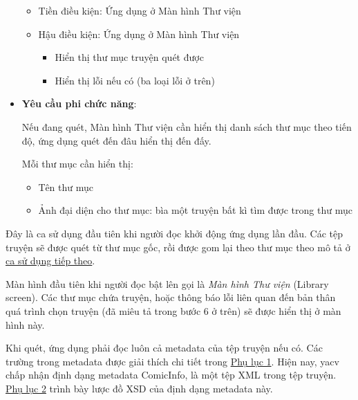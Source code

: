 \begin{itemize}
        \begin{itemize}
          \item
                Tiền điều kiện: Ứng dụng ở Màn hình Thư viện
          \item
                Hậu điều kiện: Ứng dụng ở Màn hình Thư viện

                \begin{itemize}
                  
                  \item
                        Hiển thị thư mục truyện quét được
                  \item
                        Hiển thị lỗi nếu có (ba loại lỗi ở trên)
                \end{itemize}
        \end{itemize}
  \item
        \textbf{Yêu cầu phi chức năng}:

        Nếu đang quét, Màn hình Thư viện cần hiển thị danh sách thư mục theo
        tiến độ, ứng dụng quét đến đâu hiển thị đến đấy.

        Mỗi thư mục cần hiển thị:

        \begin{itemize}
          
          \item
                Tên thư mục
          \item
                Ảnh đại diện cho thư mục: bìa một truyện bất kì tìm được trong thư
                mục
        \end{itemize}
\end{itemize}

Đây là ca sử dụng đầu tiên khi người đọc khởi động ứng dụng lần đầu. Các
tệp truyện sẽ được quét từ thư mục gốc, rồi được gom lại theo thư mục
theo mô tả ở \protect\hyperlink{P3.3.2-show-library}{ca sử dụng tiếp
  theo}.

Màn hình đầu tiên khi người đọc bật lên gọi là \emph{Màn hình Thư viện}
(Library screen). Các thư mục chứa truyện, hoặc thông báo lỗi liên quan
đến bản thân quá trình chọn truyện (đã miêu tả trong bước 6 ở trên) sẽ
được hiển thị ở màn hình này.

Khi quét, ứng dụng phải đọc luôn cả metadata của tệp truyện nếu có. Các
trường trong metadata được giải thích chi tiết trong
\protect\hyperlink{P8.1-metadata}{Phụ lục 1}. Hiện nay, yacv chấp nhận
định dạng metadata ComicInfo, là một tệp XML trong tệp truyện.
\protect\hyperlink{P8.2-comicinfo.xsd}{Phụ lục 2} trình bày lược đồ XSD
của định dạng metadata này.

